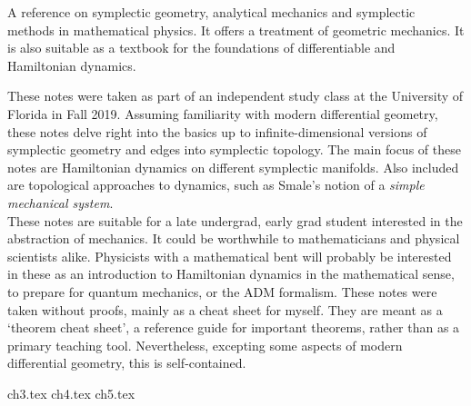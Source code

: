 \documentclass{../booknotes}
\begin{document}
\maketitle

\begin{pubdescrip}
\indent \indent A reference on symplectic geometry, analytical mechanics and symplectic methods in mathematical physics. It offers a treatment of geometric mechanics. It is also suitable as a textbook for the foundations of differentiable and Hamiltonian dynamics.
\end{pubdescrip}

\begin{transcribernote}
	\indent These notes were taken as part of an independent study class at the University of Florida in Fall 2019. Assuming familiarity with modern differential geometry, these notes delve right into the basics up to infinite-dimensional versions of symplectic geometry and edges into symplectic topology. The main focus of these notes are Hamiltonian dynamics on different symplectic manifolds. Also included are topological approaches to dynamics, such as Smale's notion of a \textit{simple mechanical system}.\\
	\indent These notes are suitable for a late undergrad, early grad student interested in the abstraction of mechanics. It could be worthwhile to mathematicians and physical scientists alike. Physicists with a mathematical bent will probably be interested in these as an introduction to Hamiltonian dynamics in the mathematical sense, to prepare for quantum mechanics, or the ADM formalism.
	\indent These notes were taken without proofs, mainly as a cheat sheet for myself. They are meant as a `theorem cheat sheet', a reference guide for important theorems, rather than as a primary teaching tool. Nevertheless, excepting some aspects of modern differential geometry, this is self-contained.
\end{transcribernote}

\tableofcontents

{ch3.tex}
{ch4.tex}
{ch5.tex}
\end{document}
